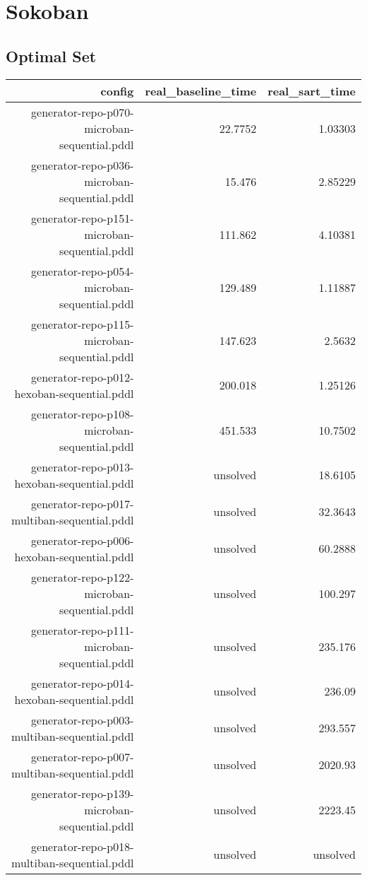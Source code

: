 \documentclass{article}
\begin{document}
                \newpage \section{Sokoban}
                    \subsection*{Optimal Set}
                    
                            \begin{center}
                            \scriptsize
                            \begin{tabular}{r|r|r}
                            config & real\_baseline\_time & real\_sart\_time\\\midrule
                             generator-repo-p070-microban-sequential.pddl&22.7752&1.03303\\
 generator-repo-p036-microban-sequential.pddl&15.476&2.85229\\
 generator-repo-p151-microban-sequential.pddl&111.862&4.10381\\
 generator-repo-p054-microban-sequential.pddl&129.489&1.11887\\
 generator-repo-p115-microban-sequential.pddl&147.623&2.5632\\
 generator-repo-p012-hexoban-sequential.pddl&200.018&1.25126\\
 generator-repo-p108-microban-sequential.pddl&451.533&10.7502\\
 generator-repo-p013-hexoban-sequential.pddl&unsolved&18.6105\\
 generator-repo-p017-multiban-sequential.pddl&unsolved&32.3643\\
 generator-repo-p006-hexoban-sequential.pddl&unsolved&60.2888\\
 generator-repo-p122-microban-sequential.pddl&unsolved&100.297\\
 generator-repo-p111-microban-sequential.pddl&unsolved&235.176\\
 generator-repo-p014-hexoban-sequential.pddl&unsolved&236.09\\
 generator-repo-p003-multiban-sequential.pddl&unsolved&293.557\\
 generator-repo-p007-multiban-sequential.pddl&unsolved&2020.93\\
 generator-repo-p139-microban-sequential.pddl&unsolved&2223.45\\
 generator-repo-p018-multiban-sequential.pddl&unsolved&unsolved\\

\end{tabular}
\end{center}
\end{document}
